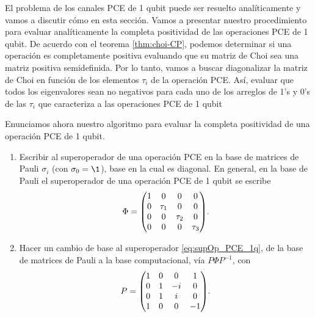 El problema de los canales PCE de 1 qubit puede ser resuelto analíticamente
y vamos a discutir cómo en esta sección. 
Vamos a presentar nuestro procedimiento para evaluar analíticamente 
la completa positividad de las operaciones PCE de 1 qubit.
De acuerdo con el teorema \ref{thm:choi-CP}, podemos determinar si
una operación es completamente positiva evaluando que su 
matriz de Choi sea una matriz positiva semidefinida.
Por lo tanto, vamos a buscar diagonalizar la matriz de Choi en 
función de los elementos $\tau_i$ de la operación PCE. Así, evaluar
que todos los eigenvalores sean no negativos para 
cada uno de los arreglos de 1's y 0's de las $\tau_i$ que 
caracteriza a las operaciones PCE de 1 qubit 

Enunciamos ahora nuestro algoritmo para evaluar la completa 
positividad de una operación PCE de 1 qubit. 
\begin{enumerate}
	\item Escribir al superoperador de una operación PCE en 
	la base de matrices de Pauli $\sigma_i$ (con $\sigma_0=\1$), 
	base en la cual es diagonal. En general, en la base de Pauli
	el superoperador de una 	operación PCE de 1 qubit se escribe
	\begin{align} \label{eq:supOp_PCE_1q}
		\Phi=\mqty(\dmat[0]{1,\tau_1,\tau_2,\tau_3}).
	\end{align}
	\item Hacer un cambio de base al superoperador \eqref{eq:supOp_PCE_1q}, 
	de la base de matrices de Pauli a la base computacional, vía $P \Phi P^{-1}$, 
	con
	\begin{align}
		P = \mqty(1&0&0&1\\ 0&1&-i&0\\ 0&1&i&0 \\ 1&0&0&-1).

\end{align}
\end{enumerate}
